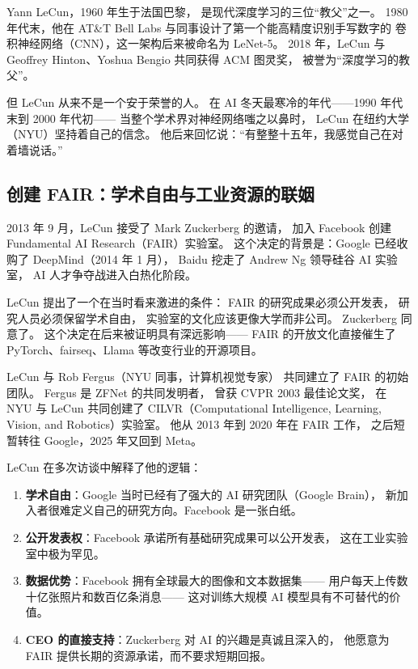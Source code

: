Yann LeCun，1960 年生于法国巴黎，
是现代深度学习的三位``教父''之一。
1980 年代末，他在 AT\&T Bell Labs 与同事设计了第一个能高精度识别手写数字的
卷积神经网络（CNN），这一架构后来被命名为 LeNet-5。
2018 年，LeCun 与 Geoffrey Hinton、Yoshua Bengio 共同获得 ACM 图灵奖，
被誉为``深度学习的教父''。

但 LeCun 从来不是一个安于荣誉的人。
在 AI 冬天最寒冷的年代——1990 年代末到 2000 年代初——
当整个学术界对神经网络嗤之以鼻时，
LeCun 在纽约大学（NYU）坚持着自己的信念。
他后来回忆说：``有整整十五年，我感觉自己在对着墙说话。''

\subsection{创建 FAIR：学术自由与工业资源的联姻}

2013 年 9 月，LeCun 接受了 Mark Zuckerberg 的邀请，
加入 Facebook 创建 Fundamental AI Research（FAIR）实验室。
这个决定的背景是：Google 已经收购了 DeepMind（2014 年 1 月），
Baidu 挖走了 Andrew Ng 领导硅谷 AI 实验室，
AI 人才争夺战进入白热化阶段。

LeCun 提出了一个在当时看来激进的条件：
FAIR 的研究成果必须公开发表，
研究人员必须保留学术自由，
实验室的文化应该更像大学而非公司。
Zuckerberg 同意了。
这个决定在后来被证明具有深远影响——
FAIR 的开放文化直接催生了 PyTorch、fairseq、Llama 等改变行业的开源项目。

LeCun 与 Rob Fergus（NYU 同事，计算机视觉专家）
共同建立了 FAIR 的初始团队。
Fergus 是 ZFNet 的共同发明者，
曾获 CVPR 2003 最佳论文奖，
在 NYU 与 LeCun 共同创建了 CILVR（Computational Intelligence, Learning,
Vision, and Robotics）实验室。
他从 2013 年到 2020 年在 FAIR 工作，
之后短暂转往 Google，2025 年又回到 Meta。

\begin{whybox}
LeCun 在多次访谈中解释了他的逻辑：
\begin{enumerate}
  \item \textbf{学术自由}：Google 当时已经有了强大的 AI 研究团队（Google Brain），
    新加入者很难定义自己的研究方向。Facebook 是一张白纸。
  \item \textbf{公开发表权}：Facebook 承诺所有基础研究成果可以公开发表，
    这在工业实验室中极为罕见。
  \item \textbf{数据优势}：Facebook 拥有全球最大的图像和文本数据集——
    用户每天上传数十亿张照片和数百亿条消息——
    这对训练大规模 AI 模型具有不可替代的价值。
  \item \textbf{CEO 的直接支持}：Zuckerberg 对 AI 的兴趣是真诚且深入的，
    他愿意为 FAIR 提供长期的资源承诺，而不要求短期回报。
\end{enumerate}
\end{whybox}


